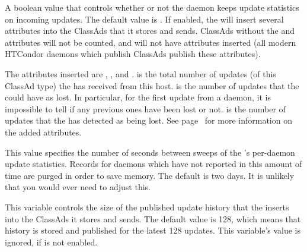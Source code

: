 \begin{description}
\label{param:CollectorDaemonStats}
\item[\Macro{COLLECTOR\_DAEMON\_STATS}]
  A boolean value that controls whether or not the  daemon
  keeps update statistics on incoming updates.  
  The default value is .
  If enabled, the  will insert several attributes
  into the ClassAds that it stores and sends.  ClassAds without the
   and  attributes will not
  be counted, and will not have attributes inserted (all modern HTCondor
  daemons which publish ClassAds publish these attributes).

  The attributes inserted are , ,
  and .   is the total number of
  updates (of this ClassAd type) the  has received 
  from this host.
   is the number of updates that the 
  could have as lost.  In particular, for the first update from a
  daemon, it is impossible to tell if any previous ones have been lost or not.
   is the number of updates that the 
  has detected as being lost.
  See page~\pageref{sec:Collector-Added-Attributes} for more information on the
  added attributes.

\label{param:CollectorStatsSweep}
\item[\Macro{COLLECTOR\_STATS\_SWEEP}]
  This value specifies the number of
  seconds between sweeps of the 's per-daemon update
  statistics.  Records for daemons which have not reported in this amount
  of time are purged in order to save memory.  The default is two days.
  It is unlikely that you would ever need to adjust this.

\label{param:CollectorDaemonHistorySize}
\item[\Macro{COLLECTOR\_DAEMON\_HISTORY\_SIZE}]
  This variable controls the
  size of the published update history that the  inserts into
  the ClassAds it stores and sends.  The default value is 128, which
  means that history is stored and published for the latest 128
  updates.  This variable's value is ignored,
  if  is not enabled.


\end{description}
